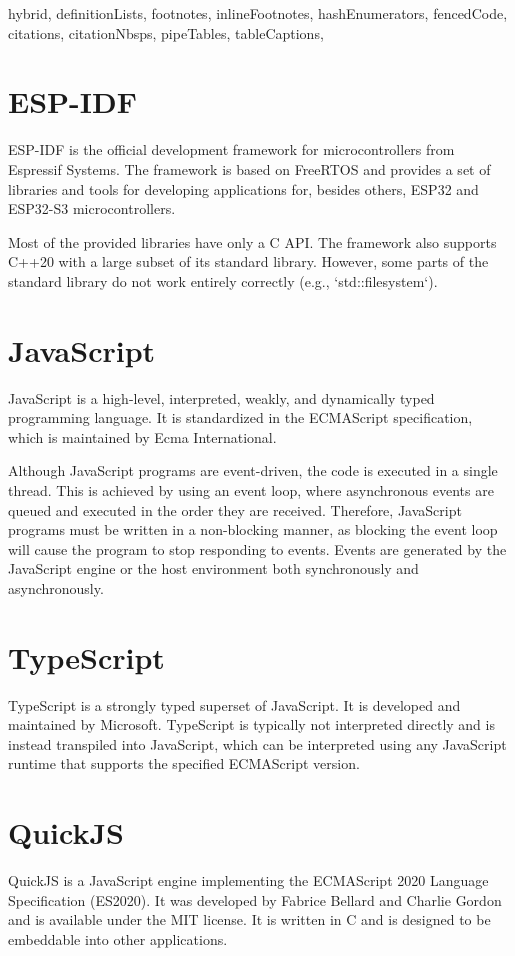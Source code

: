 \begin{markdown*}{%
  hybrid,
  definitionLists,
  footnotes,
  inlineFootnotes,
  hashEnumerators,
  fencedCode,
  citations,
  citationNbsps,
  pipeTables,
  tableCaptions,
}
\section{ESP-IDF}

ESP-IDF is the official development framework for microcontrollers from Espressif Systems. The framework is based on FreeRTOS and provides a set of libraries and tools for developing applications for, besides others, ESP32 and ESP32-S3 microcontrollers.

Most of the provided libraries have only a C API. The framework also supports C++20 with a large subset of its standard library. However, some parts of the standard library do not work entirely correctly (e.g., `std::filesystem`).

\section{JavaScript}

JavaScript is a high-level, interpreted, weakly, and dynamically typed programming language. It is standardized in the ECMAScript specification, which is maintained by Ecma International.

Although JavaScript programs are event-driven, the code is executed in a single thread. This is achieved by using an event loop, where asynchronous events are queued and executed in the order they are received. Therefore, JavaScript programs must be written in a non-blocking manner, as blocking the event loop will cause the program to stop responding to events. Events are generated by the JavaScript engine or the host environment both synchronously and asynchronously.

\section{TypeScript}

TypeScript is a strongly typed superset of JavaScript. It is developed and maintained by Microsoft. TypeScript is typically not interpreted directly and is instead transpiled into JavaScript, which can be interpreted using any JavaScript runtime that supports the specified ECMAScript version.

\section{QuickJS}

QuickJS is a JavaScript engine implementing the ECMAScript 2020 Language Specification\cite{es2020} (ES2020). It was developed by Fabrice Bellard and Charlie Gordon and is available under the MIT license. It is written in C and is designed to be embeddable into other applications.


\end{markdown*}
